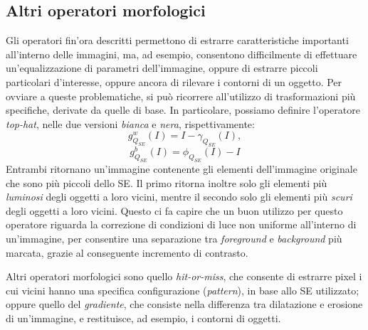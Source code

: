 \subsection{Altri operatori morfologici}
\label{subsec:math-morph-others}
Gli operatori fin'ora descritti permettono di estrarre caratteristiche importanti all'interno delle immagini, ma, ad esempio, consentono difficilmente di effettuare un'equalizzazione di parametri dell'immagine, oppure di estrarre piccoli particolari d'interesse, oppure ancora di rilevare i contorni di un oggetto. Per ovviare a queste problematiche, si pu\`o ricorrere all'utilizzo di trasformazioni pi\`u specifiche, derivate da quelle di base. In particolare, possiamo definire l'operatore \textit{top-hat}, nelle due versioni \textit{bianca} e \textit{nera}, rispettivamente:
\begin{equation}
	\label{eq:white-top-hat}
	g_{Q_{SE}}^{w}(I) = I - \gamma_{Q_{SE}}(I),
\end{equation}
\begin{equation}
	\label{eq:black-top-hat}
	g_{Q_{SE}}^{b}(I) = \phi_{Q_{SE}}(I) - I
\end{equation}
Entrambi ritornano un'immagine contenente gli elementi dell'immagine originale che sono pi\`u piccoli dello SE. Il primo ritorna inoltre solo gli elementi pi\`u \textit{luminosi} degli oggetti a loro vicini, mentre il secondo solo gli elementi pi\`u \textit{scuri} degli oggetti a loro vicini. Questo ci fa capire che un buon utilizzo per questo operatore riguarda la correzione di condizioni di luce non uniforme all'interno di un'immagine, per consentire una separazione tra \textit{foreground} e \textit{background} pi\`u marcata, grazie al conseguente incremento di contrasto.
\par Altri operatori morfologici sono quello \textit{hit-or-miss}, che consente di estrarre pixel i cui vicini hanno una specifica configurazione (\textit{pattern}), in base allo SE utilizzato; oppure quello del \textit{gradiente}, che consiste nella differenza tra dilatazione e erosione di un'immagine, e restituisce, ad esempio, i contorni di oggetti.
